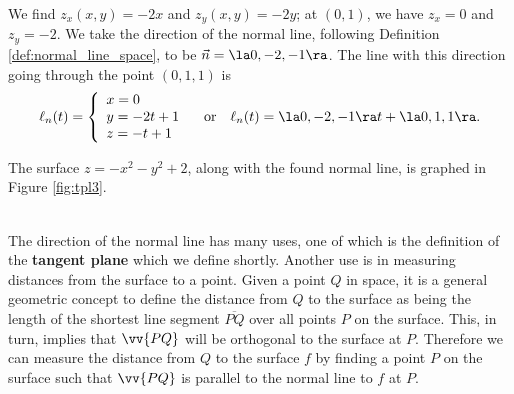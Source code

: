 {We find $z_x(x,y) = -2x$ and $z_y(x,y) = -2y$; at $(0,1)$, we have $z_x = 0$ and $z_y = -2$. We take the direction of the normal line, following Definition \ref{def:normal_line_space}, to be $\vec n=\la 0,-2,-1\ra$. The line with this direction going through the point $(0,1,1)$ is 
\[
\ell_n(t) = \left\{\begin{array}{l} x=0\\y=-2t+1\\z=-t+1\end{array}\right.\quad \text{or}\quad \ell_n(t)=\la 0,-2,-1\ra t+\la 0,1,1\ra.
\]


The surface $z=-x^2-y^2+2$, along with the found normal line, is graphed in Figure \ref{fig:tpl3}. 
}\\

The direction of the normal line has many uses, one of which is the definition of the \textbf{tangent plane} which we define shortly. Another use is in measuring distances from the surface to a point. Given a point $Q$ in space, it is a general geometric concept to define the distance from $Q$ to the surface as being the length of the shortest line segment $\overline{PQ}$ over all points $P$ on the surface. This, in turn, implies that $\vv{PQ}$ will be orthogonal to the surface at $P$. Therefore we can measure the distance from $Q$ to the surface $f$ by finding a point $P$ on the surface such that $\vv{PQ}$ is parallel to the normal line to $f$ at $P$.\\

